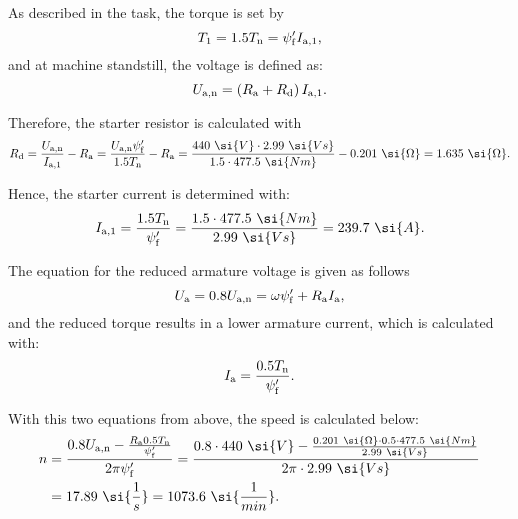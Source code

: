 \begin{solutionblock}
    As described in the task, the torque is set by
    \begin{equation}
        T_{\mathrm{1}} = 1.5 T_{\mathrm{n}} = \psi_{\mathrm{f}}' I_{\mathrm{a,1}},
    \end{equation}
    and at machine standstill, the voltage is defined as:
    \begin{equation}
        U_{\mathrm{a,n}} = \left(R_{\mathrm{a}} + R_{\mathrm{d}} \right) I_{\mathrm{a,1}}.
    \end{equation}

    Therefore, the starter resistor is calculated with
    \begin{equation}
        R_{\mathrm{d}} = \frac{U_{\mathrm{a,n}}}{I_{\mathrm{a,1}}} - \Ra
        = \frac{U_{\mathrm{a,n}} \psi_{\mathrm{f}}'}{1.5 \Tn}-\Ra
        = \frac{440 \ \si{V} \cdot 2.99 \ \si{Vs}}{1.5 \cdot 477.5 \ \si{Nm}}-0.201 \ \si{\Omega}
        = 1.635 \ \si{\Omega}.
    \end{equation}

    Hence, the starter current is determined with:
    \begin{equation}
        I_{\mathrm{a,1}} = \frac{1.5 \Tn}{\psi_{\mathrm{f}}'}
        = \frac{1.5 \cdot 477.5 \ \si{Nm}}{2.99 \ \si{Vs}}
        = 239.7 \ \si{A}.
    \end{equation}


\end{solutionblock}



\begin{solutionblock}
    The equation for the reduced armature voltage is given as follows
    \begin{equation}
        U_{\mathrm{a}} = 0.8 U_{\mathrm{a,n}}
        = \omega \psi_{\mathrm{f}}' + R_{\mathrm{a}} I_{\mathrm{a}},
    \end{equation}
    and the reduced torque results in a lower armature current, which is calculated with:
    \begin{equation}
        I_{\mathrm{a}} = \frac{0.5 T_{\mathrm{n}}}{\psi_{\mathrm{f}}'}.
    \end{equation}

    With this two equations from above, the speed is calculated below:
    \begin{align}
        \begin{split}
            n &= \frac{0.8 U_{\mathrm{a,n}} - \frac{\Ra 0.5 \Tn}{\psi_{\mathrm{f}}'}}{2 \pi \psi_{\mathrm{f}}'}
            = \frac{0.8 \cdot 440 \ \si{V} - \frac{0.201 \ \si{\Omega} \cdot 0.5 \cdot 477.5 \ \si{Nm}}{2.99 \ \si{Vs}}}{2 \pi \cdot 2.99 \ \si{Vs}}\\
            &= 17.89 \ \si{\frac{1}{s}}
            = 1073.6 \ \si{\frac{1}{min}}.
            \end{split}
    \end{align}


\end{solutionblock}


